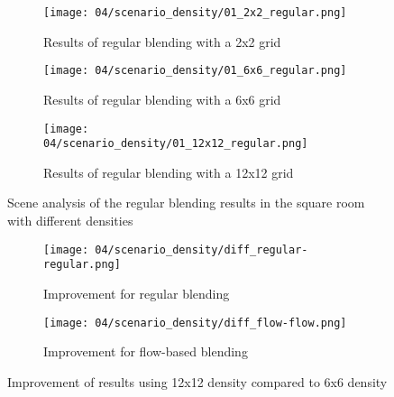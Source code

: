 \begin{figure}
\centering
    \hfill
    \begin{subfigure}[b]{0.32\textwidth}
            \centering
            \texttt{[image: 04/scenario\_density/01\_2x2\_regular.png]}
            \caption{Results of regular blending with a 2x2 grid}
    \end{subfigure}
    \hfill
    \begin{subfigure}[b]{0.32\textwidth}
            \centering
            \texttt{[image: 04/scenario\_density/01\_6x6\_regular.png]}
            \caption{Results of regular blending with a 6x6 grid}
    \end{subfigure}
    \hfill
    \begin{subfigure}[b]{0.32\textwidth}
            \centering
            \texttt{[image: 04/scenario\_density/01\_12x12\_regular.png]}
            \caption{Results of regular blending with a 12x12 grid}
    \end{subfigure}
    \hfill
  \caption{Scene analysis of the regular blending results in the square room with different densities} \label{fig:density_regular_scene_analysis}
\end{figure}

\begin{figure}
\centering
    \hfill
    \begin{subfigure}[b]{0.45\textwidth}
            \centering
            \texttt{[image: 04/scenario\_density/diff\_regular-regular.png]}
            \caption{Improvement for regular blending}
    \end{subfigure}
    \hfill
    \begin{subfigure}[b]{0.45\textwidth}
            \centering
            \texttt{[image: 04/scenario\_density/diff\_flow-flow.png]}
            \caption{Improvement for flow-based blending}
    \end{subfigure}
    \hfill
  \caption{Improvement of results using 12x12 density compared to 6x6 density} \label{fig:dens_diff_6x6_12x12}
\end{figure}


